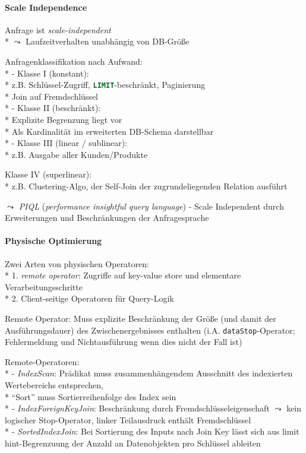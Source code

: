\paragraph{Scale Independence}
\begin{items}
	\item Anfrage ist \emph{scale-independent}
		\\*
		\( \leadsto \) Laufzeitverhalten unabhängig von DB-Größe
	\item Anfragenklassifikation nach Aufwand: \\*
		- Klasse I (konstant):
			\\*
			z.B. Schlüssel-Zugriff, \lstinline[language=sql]{LIMIT}-beschränkt, Paginierung\\*
			Join auf Fremdschlüssel \\*
		- Klasse II (beschränkt):
			\\*
			Explizite Begrenzung liegt vor
			\\*
			Als Kardinalität im erweiterten DB-Schema darstellbar \\*
		- Klasse III (linear / sublinear):
			\\*
			z.B. Ausgabe aller Kunden/Produkte
		\item Klasse IV (superlinear):
			\\*
			z.B. Clustering-Algo, der Self-Join der zugrundeliegenden Relation ausführt
	\item \( \leadsto \) \emph{PIQL} (\emph{performance insightful query language}) - Scale Independent durch Erweiterungen und Beschränkungen der Anfragesprache
\end{items}

\paragraph{Physische Optimierung}
\begin{items}
	\item Zwei Arten von physischen Operatoren: \\*
		1. \emph{remote operator}: Zugriffe auf key-value store und elementare Verarbeitungsschritte \\*
		2. Client-seitige Operatoren für Query-Logik
	\item Remote Operator: Muss explizite Beschränkung der Größe (und damit der Ausführungsdauer) des Zwischenergebnisses enthalten (i.A. \lstinline{dataStop}-Operator; Fehlermeldung und Nichtausführung wenn dies nicht der Fall ist)
	\item Remote-Operatoren: \\*
		- \emph{IndexScan}: Prädikat muss zusammenhängendem Ausschnitt des indexierten Wertebereichs entsprechen,\\*
		``Sort'' muss Sortierreihenfolge des Index sein \\*
		- \emph{IndexForeignKeyJoin}: Beschränkung durch Fremdschlüsseleigenschaft \( \leadsto \) kein logischer Stop-Operator, linker Teilausdruck enthält Fremdschlüssel \\*
		- \emph{SortedIndexJoin}: Bei Sortierung des Inputs nach Join Key lässt sich aus limit hint-Begrenzuung der Anzahl an Datenobjekten pro Schlüssel ableiten
\end{items}

